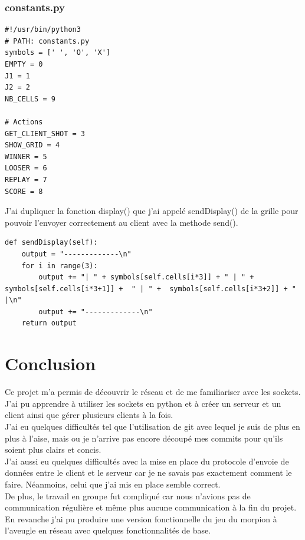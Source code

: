 \documentclass{article}
\begin{document}
\subsubsection{constants.py}
\begin{lstlisting}
#!/usr/bin/python3
# PATH: constants.py
symbols = [' ', 'O', 'X']
EMPTY = 0
J1 = 1
J2 = 2
NB_CELLS = 9

# Actions
GET_CLIENT_SHOT = 3
SHOW_GRID = 4
WINNER = 5
LOOSER = 6
REPLAY = 7
SCORE = 8
\end{lstlisting}


J'ai dupliquer la fonction display() que j'ai appelé sendDisplay() de la grille pour pouvoir l'envoyer correctement au client avec la methode send().\\
\begin{lstlisting}
def sendDisplay(self):
    output = "-------------\n"
    for i in range(3):
        output += "| " + symbols[self.cells[i*3]] + " | " + symbols[self.cells[i*3+1]] +  " | " +  symbols[self.cells[i*3+2]] + " |\n"
        output += "-------------\n"
    return output
\end{lstlisting}

\section{Conclusion}
Ce projet m'a permis de découvrir le réseau et de me familiariser avec les sockets. 
J'ai pu apprendre à utiliser les sockets en python et à créer un serveur et un client ainsi que gérer plusieurs clients à la fois.\\
J'ai eu quelques difficultés tel que l'utilisation de git avec lequel je suis de plus en plus à l'aise,
mais ou je n'arrive pas encore découpé mes commits pour qu'ils soient plus clairs et concis.\\
J'ai aussi eu quelques difficultés avec la mise en place du protocole d'envoie de données entre le client et le serveur car je ne savais pas exactement
comment le faire. Néanmoins, celui que j'ai mis en place semble correct.\\
De plus, le travail en groupe fut compliqué car nous n'avions pas de communication régulière et même plus aucune communication à la fin du projet.\\
En revanche j'ai pu produire une version fonctionnelle du jeu du morpion à l'aveugle en réseau avec quelques fonctionnalités de base.
\end{document}
